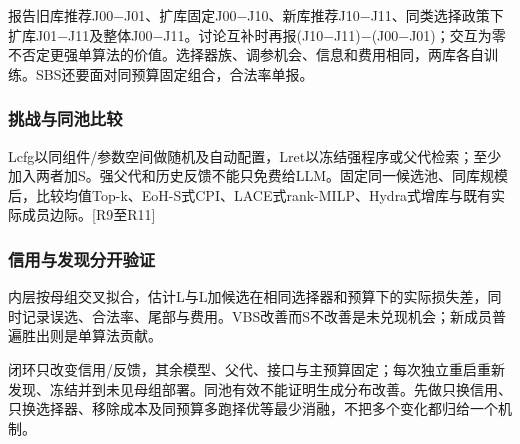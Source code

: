 \documentclass[11pt,a4paper]{article}
\newcommand{\bodytext}[1]{#1\par}
\begin{document}
\endgroup
\bodytext{报告旧库推荐J00−J01、扩库固定J00−J10、新库推荐J10−J11、同类选择政策下扩库J01−J11及整体J00−J11。讨论互补时再报(J10−J11)−(J00−J01)；交互为零不否定更强单算法的价值。选择器族、调参机会、信息和费用相同，两库各自训练。SBS还要面对同预算固定组合，合法率单报。}
\subsubsection{挑战与同池比较}
\bodytext{Lcfg以同组件/\allowbreak{}参数空间做随机及自动配置，Lret以冻结强程序或父代检索；至少加入两者加S。强父代和历史反馈不能只免费给LLM。固定同一候选池、同库规模后，比较均值Top-k、EoH-S式CPI、LACE式rank-MILP、Hydra式增库与既有实际成员边际。[R9至R11]}
\subsubsection{信用与发现分开验证}
\bodytext{内层按母组交叉拟合，估计L与L加候选在相同选择器和预算下的实际损失差，同时记录误选、合法率、尾部与费用。VBS改善而S不改善是未兑现机会；新成员普遍胜出则是单算法贡献。}
\bodytext{闭环只改变信用/\allowbreak{}反馈，其余模型、父代、接口与主预算固定；每次独立重启重新发现、冻结并到未见母组部署。同池有效不能证明生成分布改善。先做只换信用、只换选择器、移除成本及同预算多跑择优等最少消融，不把多个变化都归给一个机制。}
\clearpage
\hypertarget{part_5}{}
\end{document}
